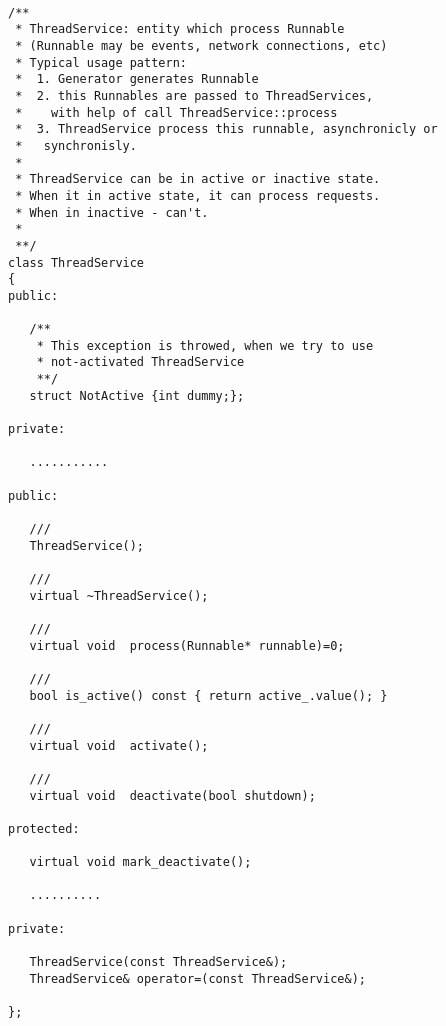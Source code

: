 \documentclass[10pt]{article}
\begin{document}
\begin{verbatim}

/**
 * ThreadService: entity which process Runnable
 * (Runnable may be events, network connections, etc)
 * Typical usage pattern:
 *  1. Generator generates Runnable
 *  2. this Runnables are passed to ThreadServices,
 *    with help of call ThreadService::process 
 *  3. ThreadService process this runnable, asynchronicly or
 *   synchronisly.
 *
 * ThreadService can be in active or inactive state.
 * When it in active state, it can process requests.
 * When in inactive - can't.
 * 
 **/
class ThreadService
{
public:

   /**
    * This exception is throwed, when we try to use
    * not-activated ThreadService
    **/
   struct NotActive {int dummy;};

private:

   ...........

public:

   ///
   ThreadService();

   ///
   virtual ~ThreadService();

   ///
   virtual void  process(Runnable* runnable)=0;

   ///
   bool is_active() const { return active_.value(); }

   ///
   virtual void  activate();

   ///
   virtual void  deactivate(bool shutdown);

protected:

   virtual void mark_deactivate();

   ..........

private:

   ThreadService(const ThreadService&);
   ThreadService& operator=(const ThreadService&);

};

\end{verbatim}
\end{document}
